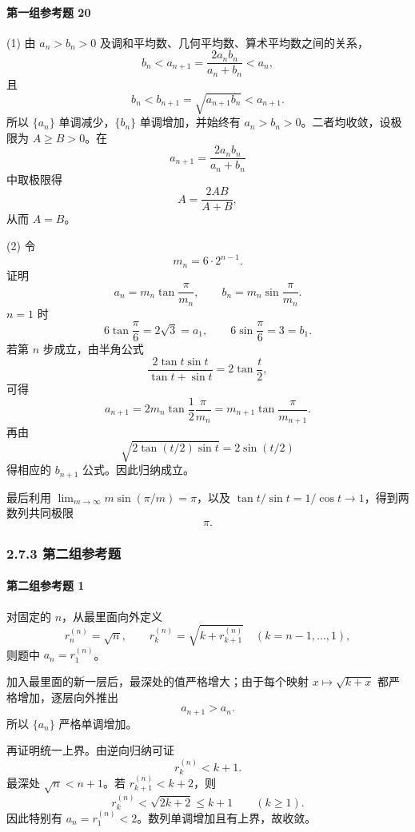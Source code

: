 \paragraph{第一组参考题 20}
\begin{xsolution}
(1) 由 $a_n>b_n>0$ 及调和平均数、几何平均数、算术平均数之间的关系，
\[
  b_n<a_{n+1}=\frac{2a_nb_n}{a_n+b_n}<a_n,
\]
且
\[
  b_n<b_{n+1}=\sqrt{a_{n+1}b_n}<a_{n+1}.
\]
所以 $\{a_n\}$ 单调减少，$\{b_n\}$ 单调增加，并始终有 $a_n>b_n>0$。二者均收敛，设极限为 $A\ge B>0$。在
\[
  a_{n+1}=\frac{2a_nb_n}{a_n+b_n}
\]
中取极限得
\[
  A=\frac{2AB}{A+B},
\]
从而 $A=B$。

(2) 令
\[
  m_n=6\cdot2^{n-1}.
\]
证明
\[
  a_n=m_n\tan\frac\pi{m_n},
  \qquad
  b_n=m_n\sin\frac\pi{m_n}.
\]
$n=1$ 时
\[
  6\tan\frac\pi6=2\sqrt3=a_1,
  \qquad
  6\sin\frac\pi6=3=b_1.
\]
若第 $n$ 步成立，由半角公式
\[
  \frac{2\tan t\sin t}{\tan t+\sin t}=2\tan\frac t2,
\]
可得
\[
  a_{n+1}=2m_n\tan\frac{1}{2}\frac\pi{m_n}
  =m_{n+1}\tan\frac\pi{m_{n+1}}.
\]
再由
\[
  \sqrt{2\tan(t/2)\sin t}=2\sin(t/2)
\]
得相应的 $b_{n+1}$ 公式。因此归纳成立。

最后利用 $\lim_{m\to\infty}m\sin(\pi/m)=\pi$，以及 $\tan t/\sin t=1/\cos t\to1$，得到两数列共同极限
\[
  \boxed{\pi}.
\]
\end{xsolution}

\subsubsection*{2.7.3 第二组参考题}

\paragraph{第二组参考题 1}
\begin{xsolution}
对固定的 $n$，从最里面向外定义
\[
  r_n^{(n)}=\sqrt n,
  \qquad
  r_k^{(n)}=\sqrt{k+r_{k+1}^{(n)}}
  \quad(k=n-1,\ldots,1),
\]
则题中 $a_n=r_1^{(n)}$。

加入最里面的新一层后，最深处的值严格增大；由于每个映射 $x\mapsto\sqrt{k+x}$ 都严格增加，逐层向外推出
\[
  a_{n+1}>a_n.
\]
所以 $\{a_n\}$ 严格单调增加。

再证明统一上界。由逆向归纳可证
\[
  r_k^{(n)}<k+1.
\]
最深处 $\sqrt n<n+1$。若 $r_{k+1}^{(n)}<k+2$，则
\[
  r_k^{(n)}<\sqrt{2k+2}\le k+1
  \qquad(k\ge1).
\]
因此特别有 $a_n=r_1^{(n)}<2$。数列单调增加且有上界，故收敛。
\end{xsolution}

